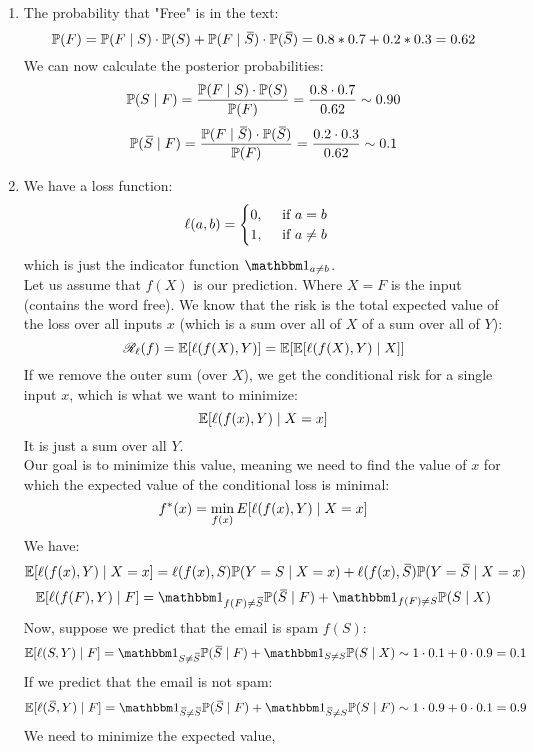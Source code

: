 \documentclass[12pt]{article}
\begin{document}
\begin{enumerate}[label=\alph*)]
    \item 
    The probability that "Free" is in the text:
    \[\mathbb{P}(F) = \mathbb{P}(F \mid S) \cdot \mathbb{P}(S)
    +  \mathbb{P}(F \mid \,\overline{\!{S}}) \cdot \mathbb{P}(\,\overline{\!{S}})
    = 0.8 * 0.7 + 0.2 * 0.3 = 0.62 \]
    We can now calculate the posterior
    probabilities:
    \[ \mathbb{P}(S \mid F)
    = \dfrac{\mathbb{P}(F \mid S) \cdot \mathbb{P}(S)}{\mathbb{P}(F)}
    = \dfrac{0.8 \cdot 0.7}{0.62}
    \sim 0.90 \]
    \[ \mathbb{P}(\,\overline{\!{S}} \mid F)
    = \dfrac{\mathbb{P}(F \mid \,\overline{\!{S}}) \cdot \mathbb{P}(\,\overline{\!{S}})}
    {\mathbb{P}(F)}
    = \dfrac{0.2 \cdot 0.3}{0.62}
    \sim 0.1 \]
    \item 
    We have a loss function:
    \[ \ell(a, b)
    = \begin{cases} 0, \quad \text{ if $a = b$} \\ 1, \quad \text{ if $a \neq b$} \end{cases} \]
    which is just the indicator function
    $\indicator_{a \neq b}$. \\ 
    Let us assume that $f(X)$
    is our prediction.
    Where $X = F$ is the input (contains
    the word free).
    We know that the risk is the total
    expected value of the loss over
    all inputs $x$
    (which is a sum over all of $X$
    of a sum over all of $Y$):
    \[ \mathscr{R}_\ell(f) = \mathbb{E}[\ell(f(X), Y)]
    = \mathbb{E}[\mathbb{E}[\ell(f(X), Y) \mid X]] \]
    If we remove the outer sum (over $X$),
    we get the conditional risk for a 
    single input $x$, which is
    what we want to minimize:
    \[ \mathbb{E}[\ell(f(x), Y) \mid X = x] \]
    It is just a sum over all $Y$. \\
    Our goal is to minimize this value,
    meaning we need to find the value of $x$
    for which the expected value 
    of the conditional loss is minimal:
    \[ f^*(x) = \min_{f(x)} \\E[\ell(f(x), Y) \mid X = x]  \]
    We have:
    \[ \mathbb{E}[\ell(f(x), Y) \mid X = x]
    = \ell(f(x), S)\mathbb{P}(Y = S \mid X = x)
    + \ell(f(x), \,\overline{\!{S}})\mathbb{P}(Y = \,\overline{\!{S}} \mid X = x) \]
    \[ \E[\ell(f(F), Y) \mid F]
    = \indicator_{f(F) \neq \olsi{S}}
    \Pb(\olsi{S} \mid F) +
    \indicator_{f(F) \neq S}
    \Pb(S \mid X)  \]
    Now, suppose we predict that
    the email is spam $f(S)$:
    \[ \E[\ell(S, Y) \mid F]
    = \indicator_{S \neq \olsi{S}}
    \Pb(\olsi{S} \mid F) +
    \indicator_{S \neq S}
    \Pb(S \mid X) 
    \sim 1 \cdot 0.1 + 0 \cdot 0.9 = 0.1 \]
    If we predict that the email is not spam:
    \[ \E[\ell(\olsi{S}, Y) \mid F]
    = \indicator_{\olsi{S} \neq \olsi{S}}
    \Pb(\olsi{S} \mid F) +
    \indicator_{\olsi{S} \neq S}
    \Pb(S \mid F) 
    \sim 1 \cdot 0.9 + 0 \cdot 0.1 = 0.9 \]
    We need to minimize the expected value,

\end{enumerate}
\end{document}
